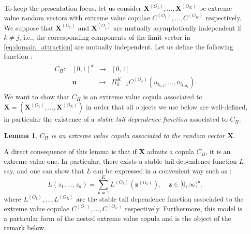 \documentclass[11pt]{article}
\newtheorem{lemma}{Lemma}
\theoremstyle{definition}
\begin{document}
	To keep the presentation focus, let us consider $\textbf{X}^{(O_1)}, \dots, \textbf{X}^{(O_K)}$ be extreme value random vectors with extreme value copulae $C^{(O_1)}, \dots, C^{(O_K)}$ respectively. We suppose that $\textbf{X}^{(O_k)}$ and $\textbf{X}^{(O_j)}$ are mutually asymptotically independent if $k \neq j$, i.e., the corresponding components of the limit vector in \eqref{eq:domain_attraction} are mutually independent. Let us define the following function :
	\begin{align*}
		\begin{array}{lrcl}
C_\Pi : & [0,1]^d & \longrightarrow & [0,1] \\
    & \textbf{u} & \longmapsto & \Pi_{k=1}^K C^{(O_k)}(u_{i_{k,1}}, \dots, u_{i_{k,d_k}}). \end{array}
	\end{align*}
	We want to show that $C_\Pi$ is an extreme value copula associated to $\textbf{X} = (\textbf{X}^{(O_1)}, \dots, \textbf{X}^{(O_K)})$ in order that all objects we use below are well-defined, in particular the existence of a \emph{stable tail dependence function} associated to $C_\Pi$.
	\begin{lemma}
		\label{lem:Cevt}
		$C_\Pi$ is an extreme value copula associated to the random vector $\textbf{X}$.
	\end{lemma}
	
	A direct consequence of this lemma is that if $\textbf{X}$ admits a copula $C_\Pi$, it is an extreme-value one. In particular, there exists a stable tail dependence function $L$ say, and one can show that $L$ can be expressed in a convenient way such as :
	\begin{equation}
		\label{eq:mutual_indep_stdf}
		L\left(z_1, \dots, z_d\right) = \sum_{k=1}^K L^{(O_k)}\left( \textbf{z}^{(O_k)} \right), \quad \textbf{z} \in [0,\infty)^d,
	\end{equation}
	where $L^{(O_1)}, \dots, L^{(O_K)}$ are the stable tail dependence function associated to the extreme value copulae $C^{(O_1)}, \dots, C^{(O_K)}$ respectively. Furthermore, this model is a particular form of the nested extreme value copula and is the object of the remark below.
	
\end{document}
